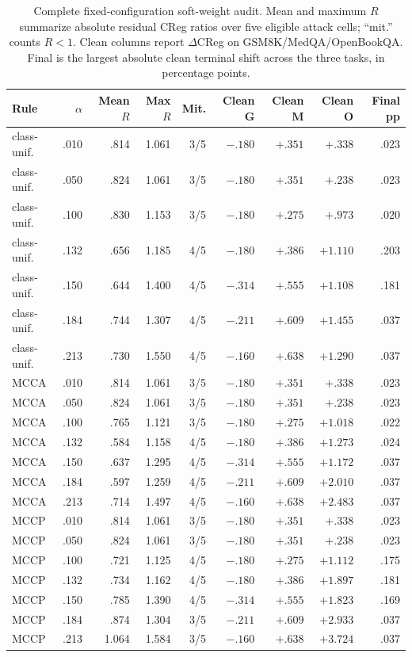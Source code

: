 \begin{table}[H]
\centering
\caption{Complete fixed-configuration soft-weight audit. Mean and maximum $R$ summarize absolute residual CReg ratios over five eligible attack cells; ``mit.'' counts $R<1$. Clean columns report $\Delta$CReg on GSM8K/MedQA/OpenBookQA. Final is the largest absolute clean terminal shift across the three tasks, in percentage points.}
\label{tab:soft-weight-all}
\scriptsize
\setlength{\tabcolsep}{2.2pt}
\begin{tabular*}{\linewidth}{@{\extracolsep{\fill}}lrrrrrrrr@{}}
\toprule
Rule & $\alpha$ & Mean $R$ & Max $R$ & Mit. & Clean G & Clean M & Clean O & Final pp \\
\midrule
class-unif. & .010 & .814 & 1.061 & 3/5 & $-.180$ & $+.351$ & $+.338$ & .023 \\
class-unif. & .050 & .824 & 1.061 & 3/5 & $-.180$ & $+.351$ & $+.238$ & .023 \\
class-unif. & .100 & .830 & 1.153 & 3/5 & $-.180$ & $+.275$ & $+.973$ & .020 \\
class-unif. & .132 & .656 & 1.185 & 4/5 & $-.180$ & $+.386$ & $+1.110$ & .203 \\
class-unif. & .150 & .644 & 1.400 & 4/5 & $-.314$ & $+.555$ & $+1.108$ & .181 \\
class-unif. & .184 & .744 & 1.307 & 4/5 & $-.211$ & $+.609$ & $+1.455$ & .037 \\
class-unif. & .213 & .730 & 1.550 & 4/5 & $-.160$ & $+.638$ & $+1.290$ & .037 \\
\midrule
MCCA & .010 & .814 & 1.061 & 3/5 & $-.180$ & $+.351$ & $+.338$ & .023 \\
MCCA & .050 & .824 & 1.061 & 3/5 & $-.180$ & $+.351$ & $+.238$ & .023 \\
MCCA & .100 & .765 & 1.121 & 3/5 & $-.180$ & $+.275$ & $+1.018$ & .022 \\
MCCA & .132 & .584 & 1.158 & 4/5 & $-.180$ & $+.386$ & $+1.273$ & .024 \\
MCCA & .150 & .637 & 1.295 & 4/5 & $-.314$ & $+.555$ & $+1.172$ & .037 \\
MCCA & .184 & .597 & 1.259 & 4/5 & $-.211$ & $+.609$ & $+2.010$ & .037 \\
MCCA & .213 & .714 & 1.497 & 4/5 & $-.160$ & $+.638$ & $+2.483$ & .037 \\
\midrule
MCCP & .010 & .814 & 1.061 & 3/5 & $-.180$ & $+.351$ & $+.338$ & .023 \\
MCCP & .050 & .824 & 1.061 & 3/5 & $-.180$ & $+.351$ & $+.238$ & .023 \\
MCCP & .100 & .721 & 1.125 & 4/5 & $-.180$ & $+.275$ & $+1.112$ & .175 \\
MCCP & .132 & .734 & 1.162 & 4/5 & $-.180$ & $+.386$ & $+1.897$ & .181 \\
MCCP & .150 & .785 & 1.390 & 4/5 & $-.314$ & $+.555$ & $+1.823$ & .169 \\
MCCP & .184 & .874 & 1.304 & 3/5 & $-.211$ & $+.609$ & $+2.933$ & .037 \\
MCCP & .213 & 1.064 & 1.584 & 3/5 & $-.160$ & $+.638$ & $+3.724$ & .037 \\
\bottomrule
\end{tabular*}
\end{table}
